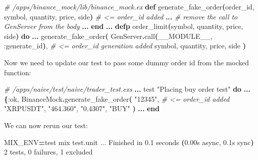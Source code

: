\documentclass[
  oneside]{book}
\newenvironment{Shaded}{\begin{snugshade}}{\end{snugshade}}
\newcommand{\CommentTok}[1]{\textcolor[rgb]{0.56,0.35,0.01}{\textit{#1}}}
\newcommand{\ConstantTok}[1]{\textcolor[rgb]{0.56,0.35,0.01}{#1}}
\newcommand{\ErrorTok}[1]{\textcolor[rgb]{0.64,0.00,0.00}{\textbf{#1}}}
\newcommand{\ExtensionTok}[1]{#1}
\newcommand{\FunctionTok}[1]{\textcolor[rgb]{0.13,0.29,0.53}{\textbf{#1}}}
\newcommand{\KeywordTok}[1]{\textcolor[rgb]{0.13,0.29,0.53}{\textbf{#1}}}
\newcommand{\NormalTok}[1]{#1}
\newcommand{\OperatorTok}[1]{\textcolor[rgb]{0.81,0.36,0.00}{\textbf{#1}}}
\newcommand{\StringTok}[1]{\textcolor[rgb]{0.31,0.60,0.02}{#1}}
\newcommand{\VariableTok}[1]{\textcolor[rgb]{0.00,0.00,0.00}{#1}}
\begin{document}
\begin{Shaded}
\begin{Highlighting}[]
\CommentTok{\# /apps/binance\_mock/lib/binance\_mock.ex}
  \KeywordTok{def}\NormalTok{ generate\_fake\_order}\FunctionTok{(}\NormalTok{order\_id, symbol, quantity, price, side}\FunctionTok{)} \CommentTok{\# \textless{}= order\_id added}
    \OperatorTok{...}
    \CommentTok{\# remove the call to GenServer from the body}
    \OperatorTok{...}
  \KeywordTok{end}
  \OperatorTok{...}
  \KeywordTok{defp}\NormalTok{ order\_limit}\FunctionTok{(}\NormalTok{symbol, quantity, price, side}\FunctionTok{)} \KeywordTok{do}
    \OperatorTok{...}
\NormalTok{      generate\_fake\_order}\FunctionTok{(}
        \ConstantTok{GenServer}\OperatorTok{.}\NormalTok{call}\FunctionTok{(}\ConstantTok{\_\_MODULE\_\_}\NormalTok{, }\VariableTok{:generate\_id}\FunctionTok{)}\NormalTok{, }\CommentTok{\# \textless{}= order\_id generation added}
\NormalTok{        symbol,}
\NormalTok{        quantity,}
\NormalTok{        price,}
\NormalTok{        side}
      \FunctionTok{)}
\end{Highlighting}
\end{Shaded}

Now we need to update our test to pass some dummy order id from the mocked function:

\begin{Shaded}
\begin{Highlighting}[]
\CommentTok{\# /apps/naive/test/naive/trader\_test.exs}
  \OperatorTok{...}
\NormalTok{  test }\StringTok{"Placing buy order test"} \KeywordTok{do}
    \OperatorTok{...}
      \FunctionTok{\{}\VariableTok{:ok}\NormalTok{, }\ConstantTok{BinanceMock}\OperatorTok{.}\NormalTok{generate\_fake\_order}\FunctionTok{(}
        \StringTok{"12345"}\NormalTok{,                        }\CommentTok{\# \textless{}= order\_id added}
        \StringTok{"XRPUSDT"}\NormalTok{,}
        \StringTok{"464.360"}\NormalTok{,}
        \StringTok{"0.4307"}\NormalTok{,}
        \StringTok{"BUY"}
      \FunctionTok{)}
   \OperatorTok{...}
  \KeywordTok{end}
\end{Highlighting}
\end{Shaded}

We can now rerun our test:

\begin{Shaded}
\begin{Highlighting}[]
\VariableTok{MIX\_ENV}\OperatorTok{=}\NormalTok{test }\ExtensionTok{mix}\NormalTok{ test.unit}
\ExtensionTok{...}
\ExtensionTok{Finished}\NormalTok{ in 0.1 seconds }\ErrorTok{(}\ExtensionTok{0.00s}\NormalTok{ async, 0.1s sync}\KeywordTok{)}
\ExtensionTok{2}\NormalTok{ tests, 0 failures, 1 excluded}
\end{Highlighting}
\end{Shaded}
\end{document}
